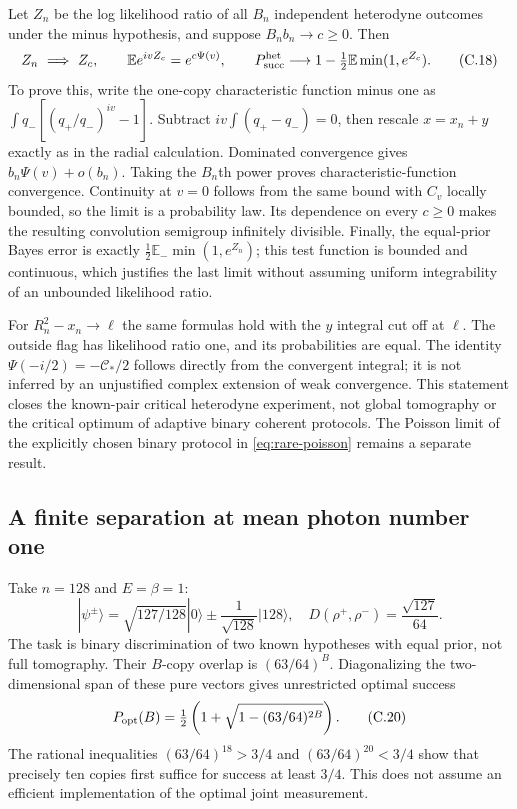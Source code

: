 Let $Z_n$ be the log likelihood ratio of all $B_n$ independent heterodyne
outcomes under the minus hypothesis, and suppose $B_nb_n\to c\ge0$.
Then
\[
 Z_n\ \Longrightarrow\ Z_c,\qquad
 \mathbb E e^{ivZ_c}=e^{c\Psi(v)},\qquad
 P_{\rm succ}^{\rm het}\longrightarrow
     1-\tfrac12\mathbb E\min(1,e^{Z_c}).
 \tag{C.18}\label{eq:rare-critical-experiment}
\]
To prove this, write the one-copy characteristic function minus one as
$\int q_-[(q_+/q_-)^{iv}-1]$. Subtract
$iv\int(q_+-q_-)=0$, then rescale $x=x_n+y$ exactly as in the radial
calculation. Dominated convergence gives $b_n\Psi(v)+o(b_n)$. Taking the
$B_n$th power proves characteristic-function convergence. Continuity at
$v=0$ follows from the same bound with $C_v$ locally bounded, so the limit
is a probability law. Its dependence on every $c\ge0$ makes the resulting
convolution semigroup infinitely divisible. Finally, the equal-prior Bayes
error is exactly $\tfrac12\mathbb E_-\min(1,e^{Z_n})$; this test function is
bounded and continuous, which justifies the last limit without assuming
uniform integrability of an unbounded likelihood ratio.

For $R_n^2-x_n\to\ell$ the same formulas hold with the $y$ integral cut off
at $\ell$. The outside flag has likelihood ratio one, and its probabilities
are equal. The identity $\Psi(-i/2)=-\mathcal C_*/2$ follows directly from
the convergent integral; it is not inferred by an unjustified complex
extension of weak convergence. This statement closes the known-pair critical
heterodyne experiment, not global tomography or the critical optimum of
adaptive binary coherent protocols. The Poisson limit of the explicitly
chosen binary protocol in \eqref{eq:rare-poisson} remains a separate result.

\subsection{A finite separation at mean photon number one}
Take $n=128$ and $E=\beta=1$:
\[
 |\psi^\pm\rangle=\sqrt{127/128}|0\rangle
                \pm\frac1{\sqrt{128}}|128\rangle,
 \quad D(\rho^+,\rho^-)=\frac{\sqrt{127}}{64}.
 \tag{C.19}\label{eq:rare-128}
\]
The task is binary discrimination of two known hypotheses with equal prior,
not full tomography. Their $B$-copy overlap is $(63/64)^B$.
Diagonalizing the two-dimensional span of these pure vectors gives
unrestricted optimal success
\[
 P_{\rm opt}(B)=\tfrac12\left(1+\sqrt{1-(63/64)^{2B}}\right).
 \tag{C.20}\label{eq:rare-helstrom}
\]
The rational inequalities $(63/64)^{18}>3/4$ and
$(63/64)^{20}<3/4$ show that precisely ten copies first suffice for success
at least $3/4$. This does not assume an efficient implementation of the
optimal joint measurement.

